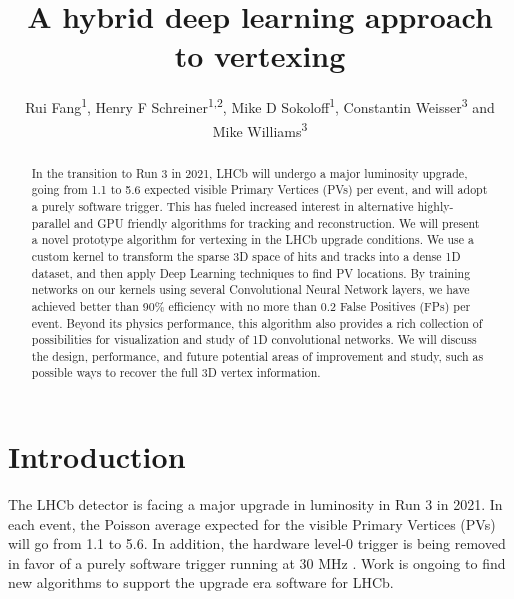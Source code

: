 \documentclass[a4paper]{jpconf}
\begin{document}
\title{A hybrid deep learning approach to vertexing}

\author{
   Rui Fang\textsuperscript{1},
   Henry F Schreiner\textsuperscript{1,2},
   Mike D Sokoloff\textsuperscript{1},
   Constantin Weisser\textsuperscript{3} and
   Mike Williams\textsuperscript{3}
}

\address{
    \textsuperscript{1} University of Cincinnati, Cincinnati, OH, United States
}
\address{
    \textsuperscript{2} Princeton University, Princeton, NJ, United States
}
\address{
    \textsuperscript{3} Massachusetts Institute of Technology, Cambridge, MA, United States
}


\begin{abstract}
In the transition to Run 3 in 2021, LHCb will undergo a major luminosity upgrade, going from 1.1 to 5.6 expected visible Primary Vertices (PVs) per event, and will adopt a purely software trigger. This has fueled increased interest in alternative highly-parallel and GPU friendly algorithms for tracking and reconstruction. We will present a novel prototype algorithm for vertexing in the LHCb upgrade conditions.
We use a custom kernel to transform the sparse 3D space of hits and tracks into a dense 1D dataset, and then apply Deep Learning techniques to find PV locations. By training networks on our kernels using several Convolutional Neural Network layers, we have achieved better than 90\% efficiency with no more than 0.2 False Positives (FPs) per event. Beyond its physics performance, this algorithm also provides a rich collection of possibilities for visualization and study of 1D convolutional networks. We will discuss the design, performance, and future potential areas of improvement and study, such as possible ways to recover the full 3D vertex information.
\end{abstract}


\section{Introduction}


The LHCb detector is facing a major upgrade in luminosity in Run 3 in 2021. In each event, the Poisson average expected for the visible Primary Vertices (PVs) will go from 1.1 to 5.6. In addition, the hardware level-0 trigger is being removed in favor of a purely software trigger running at 30 MHz \cite{CERN-LHCC-2014-016}. Work is ongoing to find new algorithms to support the upgrade era software for LHCb.
\end{document}
